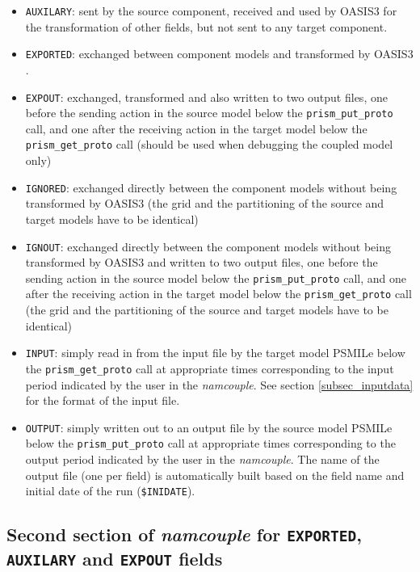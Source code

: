 \begin{itemize}
\item {\tt AUXILARY}: sent by the source component, received and used by
  OASIS3  for the transformation of other fields, but not sent to any target component.
\item {\tt EXPORTED}: exchanged between component models and
  transformed by OASIS3 .
\item {\tt EXPOUT}: exchanged, transformed and also written to two
  output files, one before the sending action in the source model
  below the {\tt prism\_put\_proto} call, and one after the receiving
  action in the target model below the {\tt prism\_get\_proto} call (should
  be used when debugging the coupled model only)
\item {\tt IGNORED}: exchanged directly between the component models
  without being transformed by OASIS3 (the grid and the
  partitioning of the source and target models have to be
  identical)
\item {\tt IGNOUT}: exchanged directly between the component models
  without being transformed by OASIS3  and written to two
  output files, one before the sending action in the source model
  below the {\tt prism\_put\_proto} call, and one after the receiving
  action in the target model below the {\tt prism\_get\_proto} call
  (the grid and the partitioning of the source and target models have to be
  identical)
\item {\tt INPUT}: simply read in from the input file by the target
  model PSMILe below the {\tt prism\_get\_proto} call at appropriate
  times corresponding to the input period indicated by the user in the
  {\it namcouple}. See section
  \ref{subsec_inputdata} for the format of the input file.
\item {\tt OUTPUT}: simply written out to an output file by the source
  model PSMILe below the {\tt prism\_put\_proto} call at appropriate
  times corresponding to the output period indicated by the user in
  the {\it namcouple}. The name of the output file (one per field) is
  automatically built based on the field name and initial date of the
  run ({\tt \$INIDATE}).

\end{itemize}

\subsection{Second section of {\it namcouple} for {\tt EXPORTED}, {\tt
      AUXILARY} and {\tt EXPOUT} fields}
\label{subsubsec_secondEXPORTED}

